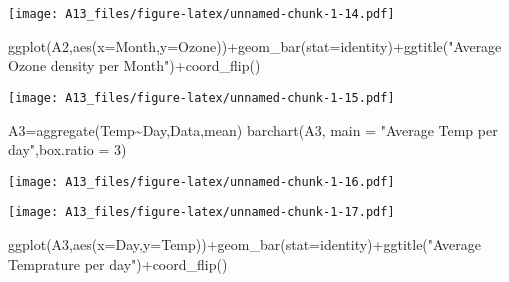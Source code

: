 \documentclass[
]{article}
\newenvironment{Shaded}{\begin{snugshade}}{\end{snugshade}}
\newcommand{\AttributeTok}[1]{\textcolor[rgb]{0.77,0.63,0.00}{#1}}
\newcommand{\DecValTok}[1]{\textcolor[rgb]{0.00,0.00,0.81}{#1}}
\newcommand{\FunctionTok}[1]{\textcolor[rgb]{0.00,0.00,0.00}{#1}}
\newcommand{\NormalTok}[1]{#1}
\newcommand{\OtherTok}[1]{\textcolor[rgb]{0.56,0.35,0.01}{#1}}
\newcommand{\SpecialCharTok}[1]{\textcolor[rgb]{0.00,0.00,0.00}{#1}}
\newcommand{\StringTok}[1]{\textcolor[rgb]{0.31,0.60,0.02}{#1}}
\begin{document}
\texttt{[image: A13\_files/figure-latex/unnamed-chunk-1-14.pdf]}

\begin{Shaded}
\begin{Highlighting}[]
\FunctionTok{ggplot}\NormalTok{(A2,}\FunctionTok{aes}\NormalTok{(}\AttributeTok{x=}\NormalTok{Month,}\AttributeTok{y=}\NormalTok{Ozone))}\SpecialCharTok{+}\FunctionTok{geom\_bar}\NormalTok{(}\AttributeTok{stat=}\StringTok{\textquotesingle{}identity\textquotesingle{}}\NormalTok{)}\SpecialCharTok{+}\FunctionTok{ggtitle}\NormalTok{(}\StringTok{"Average Ozone density per Month"}\NormalTok{)}\SpecialCharTok{+}\FunctionTok{coord\_flip}\NormalTok{()}
\end{Highlighting}
\end{Shaded}

\texttt{[image: A13\_files/figure-latex/unnamed-chunk-1-15.pdf]}

\begin{Shaded}
\begin{Highlighting}[]
\NormalTok{A3}\OtherTok{=}\FunctionTok{aggregate}\NormalTok{(Temp}\SpecialCharTok{\textasciitilde{}}\NormalTok{Day,Data,mean)}
\FunctionTok{barchart}\NormalTok{(A3, }\AttributeTok{main =} \StringTok{"Average Temp per day"}\NormalTok{,}\AttributeTok{box.ratio =} \DecValTok{3}\NormalTok{)}
\end{Highlighting}
\end{Shaded}

\texttt{[image: A13\_files/figure-latex/unnamed-chunk-1-16.pdf]}

\begin{Shaded}
\end{Shaded}

\texttt{[image: A13\_files/figure-latex/unnamed-chunk-1-17.pdf]}

\begin{Shaded}
\begin{Highlighting}[]
\FunctionTok{ggplot}\NormalTok{(A3,}\FunctionTok{aes}\NormalTok{(}\AttributeTok{x=}\NormalTok{Day,}\AttributeTok{y=}\NormalTok{Temp))}\SpecialCharTok{+}\FunctionTok{geom\_bar}\NormalTok{(}\AttributeTok{stat=}\StringTok{\textquotesingle{}identity\textquotesingle{}}\NormalTok{)}\SpecialCharTok{+}\FunctionTok{ggtitle}\NormalTok{(}\StringTok{"Average Temprature per day"}\NormalTok{)}\SpecialCharTok{+}\FunctionTok{coord\_flip}\NormalTok{()}
\end{Highlighting}
\end{Shaded}
\end{document}
